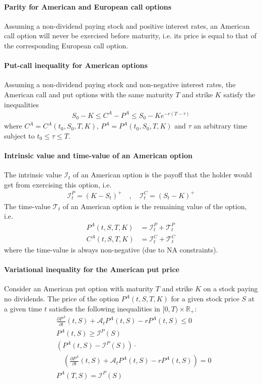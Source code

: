 \documentclass[a4paper,landscape,7pt,fleqn]{scrartcl}
\begin{document}
\begin{multicols*}{3}
\paragraph{Parity for American and European call options}
Assuming a non-dividend paying stock and positive interest rates, an American call option will never be exercised before maturity, i.e. its price is equal to that of the corresponding European call option.

\paragraph{Put-call inequality for American options}
Assuming a non-dividend paying stock and non-negative interest rates, the American call and put options with the same maturity $T$ and strike $K$ satisfy the inequalities
\begin{align*}
S_0 - K \leq C^A - P^A \leq S_0 - K e^{-r (T-\tau)}
\end{align*}
where $C^A = C^A(t_0, S_0, T, K)$, $P^A = P^A(t_0, S_0, T, K)$ and $\tau$ an arbitrary time subject to $t_0 \leq \tau \leq T$.

\paragraph{Intrinsic value and time-value of an American option}
The intrinsic value $\mathcal{I}_t$ of an American option is the payoff that the holder would get from exercising this option, i.e.
\begin{align*}
\mathcal{I}_t^P = (K - S_t)^+ \quad , \quad \mathcal{I}_t^C = (S_t - K)^+
\end{align*}
The time-value $\mathcal{T}_t$ of an American option is the remaining value of the option, i.e.
\begin{align*}
P^A (t,S,T,K) &= \mathcal{I}_t^P + \mathcal{T}_t^P \\
C^A (t,S,T,K) &= \mathcal{I}_t^C + \mathcal{T}_t^C
\end{align*}
where the time-value is always non-negative (due to NA constraints).

\paragraph{Variational inequality for the American put price}
Consider an American put option with maturity $T$ and strike $K$ on a stock paying no dividends. The price of the option $P^A(t,S,T,K)$ for a given stock price $S$ at a given time $t$ satisfies the following inequalities in $[0,T) \times \mathbb{R}_+$:
\begin{align*}
& \frac{\partial P^A}{\partial t} (t,S) + \mathcal{A}_t P^A(t,S) - r P^A(t,S) \leq 0 \\
& P^A(t,S) \geq \mathcal{I}^P(S) \\
& \left( P^A(t,S) - \mathcal{I}^P(S) \right) \cdot \\
& \quad \left( \frac{\partial P^A}{\partial t}(t,S) + \mathcal{A}_t P^A(t,S) - r P^A(t,S) \right) = 0 \\
& P^A(T,S) = \mathcal{I}^P(S)
\end{align*}


\end{multicols*}
\end{document}
